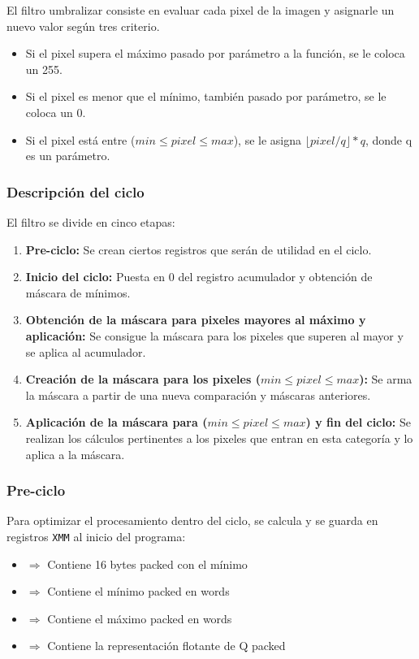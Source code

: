 El filtro umbralizar consiste en evaluar cada pixel de la imagen y asignarle un nuevo valor según tres criterio.
\begin{itemize}
\item Si el pixel supera el máximo pasado por parámetro a la función, se le coloca un 255.
\item Si el pixel es menor que el mínimo, también pasado por parámetro, se le coloca un 0.
\item Si el pixel está entre ($min \leq pixel \leq max$), se le asigna $\lfloor pixel/q \rfloor * q$, donde q es un parámetro.
\end{itemize}

\subsubsection{Descripción del ciclo}
El filtro se divide en cinco etapas:
\begin{enumerate}
\item \textbf{Pre-ciclo:} Se crean ciertos registros que serán de utilidad en el ciclo.
\item \textbf{Inicio del ciclo:} Puesta en 0 del registro acumulador y obtención de máscara de mínimos.
\item \textbf{Obtención de la máscara para pixeles mayores al máximo y aplicación:} Se consigue la máscara para los pixeles que superen al mayor y se aplica al acumulador.
\item \textbf{Creación de la máscara para los pixeles ($min \leq pixel \leq max$):} Se arma la máscara a partir de una nueva comparación y máscaras anteriores.
\item \textbf{Aplicación de la máscara para ($min \leq pixel \leq max$) y fin del ciclo:} Se realizan los cálculos pertinentes a los pixeles que entran en esta categoría y lo aplica a la máscara.
\end{enumerate}

\subsubsection{Pre-ciclo}
Para optimizar el procesamiento dentro del ciclo, se calcula y se guarda en registros \texttt{XMM} al inicio del programa:
\begin{itemize}
  \item {} $\Rightarrow$ Contiene 16 bytes packed con el mínimo
  \item {} $\Rightarrow$ Contiene el mínimo packed en words
  \item {} $\Rightarrow$ Contiene el máximo packed en words
  \item {} $\Rightarrow$ Contiene la representación flotante de Q packed
\end{itemize}

